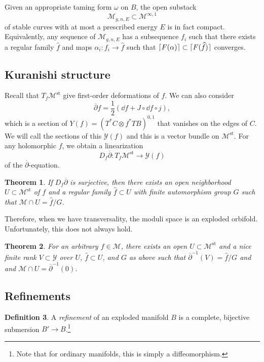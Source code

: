 \documentclass[leqno, openany]{memoir}
\DeclarePairedDelimiter{\ceil}{\lceil}{\rceil}
\newtheorem{thm}{Theorem}[section]
\theoremstyle{definition}
\newtheorem{defn}[thm]{Definition}
\theoremstyle{remark}
\theoremstyle{plain}
\theoremstyle{definition}
\theoremstyle{remark}
\newcommand{\mc}[1]{\mathcal{#1}}
\newcommand{\mr}[1]{\mathrm{#1}}
\newcommand{\ol}[1]{\overline{#1}}
\newcommand{\wh}[1]{\widehat{#1}}
\begin{document}
Given an appropriate taming form $\omega$ on $B$, the open substack
\[ \mc{M}_{g, n, E} \subset \mc{M}^{\infty,1} \]
of stable curves with at most a prescribed energy $E$ is in fact compact. Equivalently, any sequence of $\mc{M}_{g, n, E}$ has a subsequence $f_i$ such that there exists a regular family $\wh{f}$ and maps $\alpha_i \colon f_i \to \wh{f}$ such that $\ceil{ F(\alpha) } \subset \ceil{ F(\wh{f}) }$ converges.

\subsection{Kuranishi structure}
\label{subsec:kuranishi}

Recall that $T_f \mc{M}^{\mr{st}}$ give first-order deformations of $f$. We can also consider
\[ \ol{\partial} f = \frac{1}{2}(\dd{f} + J \circ \dd{f} \circ j), \]
which is a section of $Y(f) = (T^* C \otimes f^* TB)^{0,1}$ that vanishes on the edges of $C$. We will call the sections of this $\mc{Y}(f)$ and this is a vector bundle on $\mc{M}^{\mr{st}}$. For any holomorphic $f$, we obtain a linearization
\[ D_f \ol{\partial} \colon T_f \mc{M}^{\mr{st}} \to \mc{Y}(f) \]
of the $\ol{\partial}$-equation.

\begin{thm}
If $D_f \ol{\partial}$ is surjective, then there exists an open neighborhood $U \subset \mc{M}^{\mr{st}}$ of $f$ and a regular family $\wh{f} \subset U$ with finite automorphism group $G$ such that $\mc{M} \cap U = \wh{f} / G$.
\end{thm}
Therefore, when we have transversality, the moduli space is an exploded orbifold. Unfortunately, this does not always hold.

\begin{thm}
For an arbitrary $f \in \mc{M}$, there exists an open $U \subset \mc{M}^{\mr{st}}$ and a nice finite rank $V \subset \mc{Y}$ over $U$, $\wh{f} \subset U$, and $G$ as above such that $\ol{\partial}^{-1}(V) = \wh{f} / G$ and and $\mc{M} \cap U = \ol{\partial}^{-1}(0)$.
\end{thm}

\subsection{Refinements}
\label{subsec:label}

\begin{defn}
A \textit{refinement} of an exploded manifold $B$ is a complete, bijective submersion $B' \to B$.\footnote{Note that for ordinary manifolds, this is simply a diffeomorphism.}
\end{defn}
\end{document}
